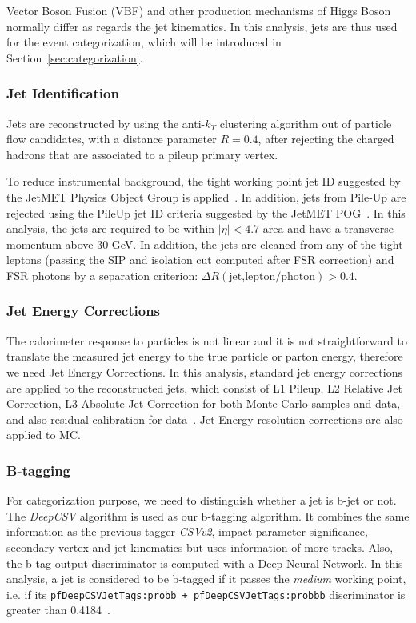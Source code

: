 Vector Boson Fusion (VBF) and other production mechanisms of Higgs Boson normally differ as regards the jet kinematics. 
In this analysis, jets are thus used for the event categorization, which will be introduced in Section~\ref{sec:categorization}.

\subsubsection{Jet Identification}

Jets are reconstructed by using the anti-$k_T$ clustering algorithm out of particle flow candidates, with a distance parameter $R = 0.4$, 
after rejecting the charged hadrons that are associated to a pileup primary  vertex.

To reduce instrumental background, the tight working point jet ID suggested by the JetMET Physics Object Group is applied~\cite{JetID2018}. 
In addition, jets from Pile-Up are rejected using the PileUp jet ID criteria suggested by the JetMET POG~\cite{JetPUID2017}. 
In this analysis, the jets are required to be within $|\eta| < 4.7$ area and have a transverse momentum above 30 GeV. 
In addition, the jets are cleaned from any of the tight leptons (passing the SIP and isolation cut computed after FSR correction) 
and FSR photons by a separation criterion: $\Delta R(\text{jet,lepton/photon}) > 0.4$.

\subsubsection{Jet Energy Corrections}

The calorimeter response to particles is not linear
and it is not straightforward to translate the measured jet energy
to the true particle or parton energy, therefore we need Jet Energy Corrections.
In this analysis, standard jet energy corrections are applied to the reconstructed jets,
which consist of L1 Pileup, L2 Relative Jet Correction,
L3 Absolute Jet Correction for both Monte Carlo samples and data,
and also residual calibration for data~\cite{JECMC2018}. Jet Energy resolution corrections are also applied to MC.


\subsubsection{B-tagging}

For categorization purpose, we need to distinguish whether a jet is b-jet or not.
The \emph{DeepCSV} algorithm is used as our b-tagging algorithm. It combines the same information as the previous tagger \emph{CSVv2}, impact parameter significance, secondary vertex and jet kinematics but uses information of more tracks. Also, the b-tag output discriminator is computed with a Deep Neural Network. 
In this analysis, a jet is considered to be b-tagged if it passes the \emph{medium} working point, i.e. if its \verb |pfDeepCSVJetTags:probb + pfDeepCSVJetTags:probbb| discriminator is greater than 0.4184~\cite{BTAG2018}.

